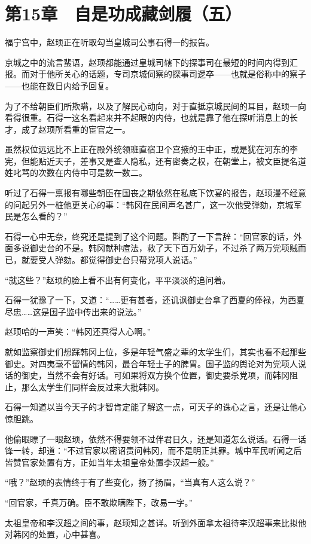 \section{第15章　自是功成藏剑履（五）}

福宁宫中，赵顼正在听取勾当皇城司公事石得一的报告。

京城之中的流言蜚语，赵顼都能通过皇城司辖下的探事司在最短的时间内得到汇报。而对于他所关心的话题，专司京城伺察的探事司逻卒——也就是俗称中的察子——也能在数日内给予回复。

为了不给朝臣们所欺瞒，以及了解民心动向，对于直抵京城民间的耳目，赵顼一向看得很重。石得一这名看起来并不起眼的内侍，也就是靠了他在探听消息上的长才，成了赵顼所看重的宦官之一。

虽然权位远远比不上正在殿外统领班直宿卫个宫掖的王中正，或是犹在河东的李宪，但能贴近天子，差事又是查人隐私，还有密奏之权，在朝堂上，被文臣提名道姓叱骂的次数在内侍中可是数一数二。

听过了石得一禀报有哪些朝臣在国丧之期依然在私底下饮宴的报告，赵顼漫不经意的问起另外一桩他更关心的事：“韩冈在民间声名甚广，这一次他受弹劾，京城军民是怎么看的？”

石得一心中无奈，终究还是提到了这个问题。斟酌了一下言辞：“回官家的话，外面多说御史台的不是。韩冈献种痘法，救了天下百万幼子，不过杀了两万党项贼而已，就要受人弹劾。都觉得御史台只帮党项人说话。”

“就这些？”赵顼的脸上看不出有何变化，平平淡淡的追问着。

石得一犹豫了一下，又道：“……更有甚者，还讥讽御史台拿了西夏的俸禄，为西夏尽忠……这是国子监中传出来的说法。”

赵顼哈的一声笑：“韩冈还真得人心啊。”

就如监察御史们想踩韩冈上位，多是年轻气盛之辈的太学生们，其实也看不起那些御史。对四夷毫不留情的韩冈，最合年轻士子的脾胃。国子监的舆论对为党项人说话的御史，当然不会有好话。可如果将双方换个位置，御史要杀党项，而韩冈阻止，那么太学生们同样会反过来大批韩冈。

石得一知道以当今天子的才智肯定能了解这一点，可天子的诛心之言，还是让他心惊胆跳。

他偷眼瞟了一眼赵顼，依然不得要领不过伴君日久，还是知道怎么说话。石得一话锋一转，却道：“不过官家以密诏责问韩冈，而不是明正其罪。城中军民听闻之后皆赞官家处置有方，正如当年太祖皇帝处置李汉超一般。”

“哦？”赵顼的表情终于有了些变化，扬了扬眉，“当真有人这么说？”

“回官家，千真万确。臣不敢欺瞒陛下，改易一字。”

太祖皇帝和李汉超之间的事，赵顼知之甚详。听到外面拿太祖待李汉超事来比拟他对韩冈的处置，心中甚喜。

